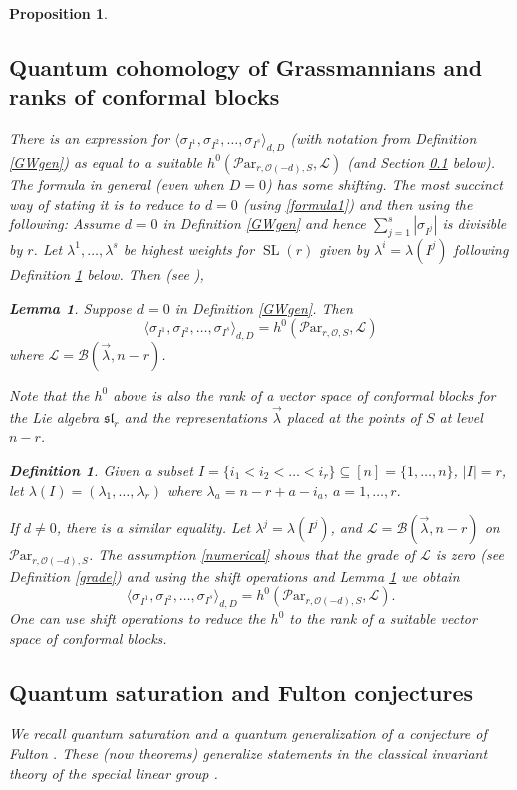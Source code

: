 \documentclass[11pt]{amsart}
\newcommand\op{\operatorname}
\newcommand\ml{\mathcal{L}}
\newcommand\Par{\mathcal{P}\text{ar} }
\newtheorem{proposition}[theorem]{Proposition}
\newtheorem{lemma}[theorem]{Lemma}
\newtheorem{defi}[theorem]{Definition}
\numberwithin{theorem}{subsection}
\begin{document}
{\begin{proposition}
\subsection{Quantum cohomology of Grassmannians and ranks of conformal blocks}\label{QCB}
There is an expression for  $\langle\sigma_{I^1}, \sigma_{I^2},\dots,\sigma_{I^s}\rangle_{d,D}$ (with notation from Definition \ref{GWgen}) as equal to  a suitable  $h^0(\Par_{r,\mathcal{O}(-d),S},\ml)$ \cites{Gepner,Witten} (and Section \ref{QCB} below). The formula in general (even when $D=0$) has some shifting. The most succinct way of stating it is to reduce to $d=0$ (using \eqref{formula1}) and then using the following: Assume $d=0$ in Definition \ref{GWgen} and hence $\sum_{j=1}^s |\sigma_{I^j}|$ is divisible by $r$.
Let $\lambda^1,\dots,\lambda^s$ be highest weights for $\op{SL}(r)$ given by $\lambda^i=\lambda(I^j)$ following Definition \ref{correspondence} below. Then  (see \cite[Proposition 3.4]{BHorn}),
\begin{lemma}\label{newlabel2}
Suppose $d=0$ in Definition \ref{GWgen}. Then
$$\langle\sigma_{I^1}, \sigma_{I^2},\dots,\sigma_{I^s}\rangle_{d,D}= h^0(\Par_{r,\mathcal{O},S},\ml)$$ where $\ml=\mathcal{B}(\vec{\lambda},n-r)$.
\end{lemma}
Note that the $h^0$ above is also the rank of a vector space of conformal blocks for the Lie algebra $\mathfrak{sl}_r$ and the representations $\vec{\lambda}$ placed at the points of $S$ at level $n-r$.
\begin{defi}\label{correspondence}
Given a subset $I=\{i_1<i_2<\dots<i_r\}\subseteq [n]=\{1,\dots,n\}$, $|I|=r$, let $\lambda(I)=(\lambda_1,\dots,\lambda_r)$ where
$\lambda_a=n-r+a-i_a,\ a=1,\dots,r.$
\end{defi}
If $d\neq 0$, there is a similar equality. Let $\lambda^j=\lambda(I^j)$, and $\ml=\mathcal{B}(\vec{\lambda},n-r)$ on $\Par_{r,\mathcal{O}(-d),S}$. The assumption \eqref{numerical} shows that the grade of $\ml$ is zero (see Definition  \ref{grade}) and using the shift operations and Lemma \ref{newlabel2} we obtain
\begin{equation}\label{newlabel3}
\langle\sigma_{I^1}, \sigma_{I^2},\dots,\sigma_{I^s}\rangle_{d,D}= h^0(\Par_{r,\mathcal{O}(-d),S},\ml).
\end{equation}
One can use shift operations to reduce the $h^0$ to the rank of a suitable vector space of conformal blocks.

\subsection{Quantum saturation and Fulton conjectures}
We recall quantum saturation \cite{BHorn} and a quantum generalization of a conjecture of Fulton \cite[Remark 8.5]{BKq}. These (now theorems) generalize statements in the classical invariant theory of the special linear group \cite{KT,KTW}.


\end{proposition}}
\end{document}
